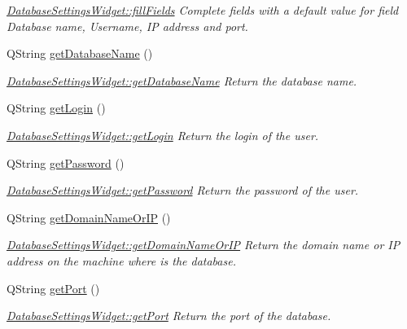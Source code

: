 \begin{DoxyCompactItemize}
\begin{DoxyCompactList}\small\item\em \hyperlink{classGui_1_1Widgets_1_1DatabaseSettingsWidget_a79e2fb995dbd14f4c4d0b54bdfaf5d5f}{Database\-Settings\-Widget\-::fill\-Fields} Complete fields with a default value for field Database name, Username, I\-P address and port. \end{DoxyCompactList}\item 
Q\-String \hyperlink{classGui_1_1Widgets_1_1DatabaseSettingsWidget_a5096ca0a98fa130fa49222b554e5dacf}{get\-Database\-Name} ()
\begin{DoxyCompactList}\small\item\em \hyperlink{classGui_1_1Widgets_1_1DatabaseSettingsWidget_a5096ca0a98fa130fa49222b554e5dacf}{Database\-Settings\-Widget\-::get\-Database\-Name} Return the database name. \end{DoxyCompactList}\item 
Q\-String \hyperlink{classGui_1_1Widgets_1_1DatabaseSettingsWidget_ad84fec6fb4c19610e3de6608be85f8cc}{get\-Login} ()
\begin{DoxyCompactList}\small\item\em \hyperlink{classGui_1_1Widgets_1_1DatabaseSettingsWidget_ad84fec6fb4c19610e3de6608be85f8cc}{Database\-Settings\-Widget\-::get\-Login} Return the login of the user. \end{DoxyCompactList}\item 
Q\-String \hyperlink{classGui_1_1Widgets_1_1DatabaseSettingsWidget_abb8ebee9842d5efc50f4309bb4a650f1}{get\-Password} ()
\begin{DoxyCompactList}\small\item\em \hyperlink{classGui_1_1Widgets_1_1DatabaseSettingsWidget_abb8ebee9842d5efc50f4309bb4a650f1}{Database\-Settings\-Widget\-::get\-Password} Return the password of the user. \end{DoxyCompactList}\item 
Q\-String \hyperlink{classGui_1_1Widgets_1_1DatabaseSettingsWidget_aebcc7341f204c1b8f8ea930154c1a331}{get\-Domain\-Name\-Or\-I\-P} ()
\begin{DoxyCompactList}\small\item\em \hyperlink{classGui_1_1Widgets_1_1DatabaseSettingsWidget_aebcc7341f204c1b8f8ea930154c1a331}{Database\-Settings\-Widget\-::get\-Domain\-Name\-Or\-I\-P} Return the domain name or I\-P address on the machine where is the database. \end{DoxyCompactList}\item 
Q\-String \hyperlink{classGui_1_1Widgets_1_1DatabaseSettingsWidget_ad2f99b62e1ae43f973fbf135ee889908}{get\-Port} ()
\begin{DoxyCompactList}\small\item\em \hyperlink{classGui_1_1Widgets_1_1DatabaseSettingsWidget_ad2f99b62e1ae43f973fbf135ee889908}{Database\-Settings\-Widget\-::get\-Port} Return the port of the database. \end{DoxyCompactList}\end{DoxyCompactItemize}


